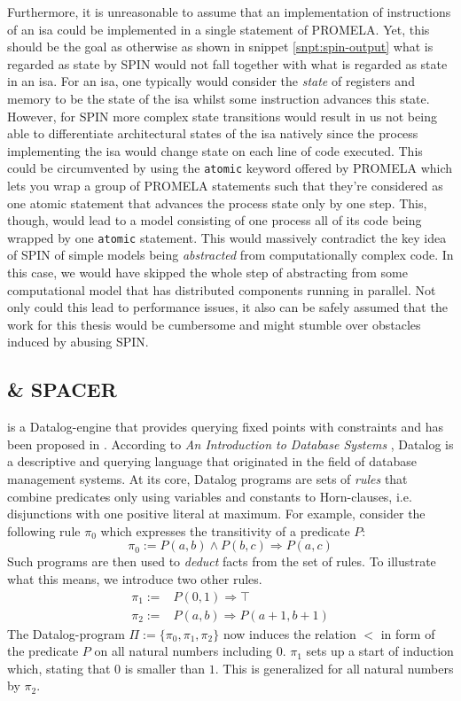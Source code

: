 Furthermore, it is unreasonable to assume that an implementation of instructions of an \gls{isa} could be implemented in a single statement of PROMELA.
Yet, this should be the goal as otherwise as shown in snippet \ref{snpt:spin-output} what is regarded as state by SPIN would not fall together with what is regarded as state in an \gls{isa}.
For an \gls{isa}, one typically would consider the \textit{state} of registers and memory to be the state of the \gls{isa} whilst some instruction advances this state.
However, for SPIN more complex state transitions would result in us not being able to differentiate architectural states of the \gls{isa} natively since the process implementing the \gls{isa} would change state on each line of code executed.
This could be circumvented by using the \lstinline{atomic} keyword offered by PROMELA which lets you wrap a group of PROMELA statements such that they're considered as one atomic statement that advances the process state only by one step.
This, though, would lead to a model consisting of one process all of its code being wrapped by one \lstinline{atomic} statement.
This would massively contradict the key idea of SPIN of simple models being \textit{abstracted} from computationally complex code.
In this case, we would have skipped the whole step of abstracting from some computational model that has distributed components running in parallel.
Not only could this lead to performance issues, it also can be safely assumed that the work for this thesis would be cumbersome and might stumble over obstacles induced by abusing SPIN.

\subsection{\muZ{} \& SPACER}
\label{sec:spacer}

\muZ{} is a Datalog-engine that provides querying fixed points with constraints and has been proposed in \cite{Hoder11}.
According to \textit{An Introduction to Database Systems} \cite[p.790ff]{Date00}, Datalog is a descriptive and querying language that originated in the field of database management systems.
At its core, Datalog programs are sets of \textit{rules} that combine predicates only using variables and constants to Horn-clauses, i.e. disjunctions with one positive literal at maximum.
For example, consider the following rule $ \pi_0 $ which expresses the transitivity of a predicate $ P $:
\begin{equation*}
    \pi_0 := P(a, b) \land P(b, c) \Rightarrow P(a, c)
\end{equation*}
Such programs are then used to \textit{deduct} facts from the set of rules.
To illustrate what this means, we introduce two other rules.
\begin{align*}
    \pi_1 := & P(0, 1) \Rightarrow \top \\
    \pi_2 := & P(a, b) \Rightarrow P(a + 1, b + 1)
\end{align*}
The Datalog-program $ \Pi := \{ \pi_0, \pi_1, \pi_2 \} $ now induces the relation $ < $ in form of the predicate $ P $ on all natural numbers including $ 0 $.
$ \pi_1 $ sets up a start of induction which, stating that $ 0 $ is smaller than $ 1 $.
This is generalized for all natural numbers by $ \pi_2 $.

